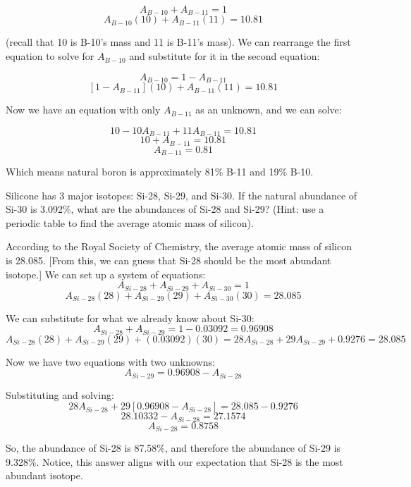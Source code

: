 $$A_{B-10} + A_{B-11} = 1$$
$$A_{B-10} \left( 10 \right) + A_{B-11} \left( 11 \right) = 10.81$$

(recall that 10 is B-10's mass and 11 is B-11's mass). We can rearrange the 
first equation to solve for $A_{B-10}$ and substitute for it in the second 
equation:

$$A_{B-10} = 1 - A_{B-11}$$
$$\left[ 1 - A_{B-11} \right] \left( 10 \right) + A_{B-11} \left( 11 \right) = 10.81$$

Now we have an equation with only $A_{B-11}$ as an unknown, and we can solve:

$$10 - 10A_{B-11} + 11A_{B-11} = 10.81$$
$$10 + A_{B-11} = 10.81$$
$$A_{B-11} = 0.81$$

Which means natural boron is approximately 81\% B-11 and 19\% B-10. 

\begin{Exercise}[title = {Finding Abundances}, label = abund]
Silicone has 3 major isotopes: Si-28, Si-29, and Si-30. If the natural 
abundance of Si-30 is 3.092\%, what are the abundances of Si-28 and Si-29? 
(Hint: use a periodic table to find the average atomic mass of silicon).
\end{Exercise}

\begin{Answer}[ref = abund]
According to the Royal Society of Chemistry, the average atomic mass of silicon 
is 28.085. [From this, we can guess that Si-28 should be the most abundant 
isotope.] We can set up a system of equations:
$$A_{Si-28} + A_{Si-29} + A_{Si-30} = 1$$
$$A_{Si-28} \left( 28 \right) + A_{Si-29} \left( 29 \right) + A_{Si-30} \left( 30 \right) = 28.085$$

We can substitute for what we already know about Si-30:
$$A_{Si-28} + A_{Si-29} = 1 - 0.03092 = 0.96908$$
$$A_{Si-28} \left( 28 \right) + A_{Si-29} \left( 29 \right) + \left( 0.03092 \right) \left(30 \right) = 28A_{Si-28} + 29A_{Si-29} + 0.9276 = 28.085$$

Now we have two equations with two unknowns:
$$A_{Si-29} = 0.96908 - A_{Si-28}$$

Substituting and solving:
$$28A_{Si-28} + 29 \left[ 0.96908 - A_{Si-28} \right] = 28.085 - 0.9276$$
$$28.10332 - A_{Si-28} = 27.1574$$
$$A_{Si-28} = 0.8758$$

So, the abundance of Si-28 is 87.58\%, and therefore the abundance of Si-29 is 
9.328\%. Notice, this answer aligns with our expectation that Si-28 is the most 
abundant isotope. 
\end{Answer}
